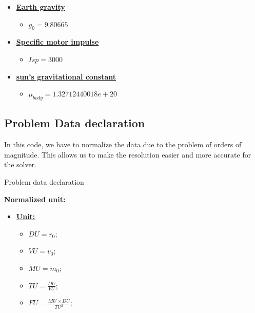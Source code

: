 \documentclass{article}
\begin{document}
\begin{algorithm}[H]
\begin{algorithmic}
\begin{itemize}[]
				\item \textbf{\underline{Earth gravity}}
				\begin{itemize}
					\item $g_0 = 9.80665$
				\end{itemize}
				\item \textbf{\underline{Specific motor impulse}}
				\begin{itemize}
					\item $Isp = 3000$
				\end{itemize}
				\item \textbf{\underline{sun's gravitational constant}}
				\begin{itemize}
					\item $\mu_{body} = 1.32712440018e+20$
				\end{itemize}
			\end{itemize}
		\end{algorithmic}
	\end{algorithm}
	
	
	\subsection{Problem Data declaration}
	
	In this code, we have to normalize the data due to the problem of orders of magnitude. This allows us to make the resolution easier and more accurate for the solver.
	
	\begin{algorithm}[H]
		\caption{Problem data declaration}\label{alg:satellite_maneuvering}
		\begin{algorithmic}
			
			\State \textbf{Normalized unit:} \\
			\begin{itemize}[]
				\item \textbf{\underline{Unit:}}
				\begin{itemize}
					\item $DU = r_0$; %
					\item $VU = v_0$; %
					\item $MU = m_0$; %
					\item $TU = \frac{DU}{VU}$; %
					\item $FU = \frac{MU \times DU}{TU^2}$; %
				\end{itemize}
			\end{itemize}
		\end{algorithmic}
	\end{algorithm}
	
\end{document}
